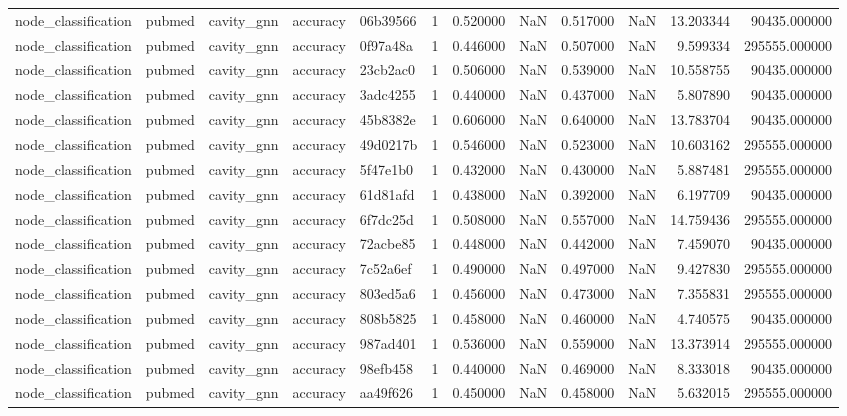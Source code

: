 \begin{tabular}{lllllrrrrrrr}
node_classification & pubmed & cavity_gnn & accuracy & 06b39566 & 1 & 0.520000 & NaN & 0.517000 & NaN & 13.203344 & 90435.000000 \\
node_classification & pubmed & cavity_gnn & accuracy & 0f97a48a & 1 & 0.446000 & NaN & 0.507000 & NaN & 9.599334 & 295555.000000 \\
node_classification & pubmed & cavity_gnn & accuracy & 23cb2ac0 & 1 & 0.506000 & NaN & 0.539000 & NaN & 10.558755 & 90435.000000 \\
node_classification & pubmed & cavity_gnn & accuracy & 3adc4255 & 1 & 0.440000 & NaN & 0.437000 & NaN & 5.807890 & 90435.000000 \\
node_classification & pubmed & cavity_gnn & accuracy & 45b8382e & 1 & 0.606000 & NaN & 0.640000 & NaN & 13.783704 & 90435.000000 \\
node_classification & pubmed & cavity_gnn & accuracy & 49d0217b & 1 & 0.546000 & NaN & 0.523000 & NaN & 10.603162 & 295555.000000 \\
node_classification & pubmed & cavity_gnn & accuracy & 5f47e1b0 & 1 & 0.432000 & NaN & 0.430000 & NaN & 5.887481 & 295555.000000 \\
node_classification & pubmed & cavity_gnn & accuracy & 61d81afd & 1 & 0.438000 & NaN & 0.392000 & NaN & 6.197709 & 90435.000000 \\
node_classification & pubmed & cavity_gnn & accuracy & 6f7dc25d & 1 & 0.508000 & NaN & 0.557000 & NaN & 14.759436 & 295555.000000 \\
node_classification & pubmed & cavity_gnn & accuracy & 72acbe85 & 1 & 0.448000 & NaN & 0.442000 & NaN & 7.459070 & 90435.000000 \\
node_classification & pubmed & cavity_gnn & accuracy & 7c52a6ef & 1 & 0.490000 & NaN & 0.497000 & NaN & 9.427830 & 295555.000000 \\
node_classification & pubmed & cavity_gnn & accuracy & 803ed5a6 & 1 & 0.456000 & NaN & 0.473000 & NaN & 7.355831 & 295555.000000 \\
node_classification & pubmed & cavity_gnn & accuracy & 808b5825 & 1 & 0.458000 & NaN & 0.460000 & NaN & 4.740575 & 90435.000000 \\
node_classification & pubmed & cavity_gnn & accuracy & 987ad401 & 1 & 0.536000 & NaN & 0.559000 & NaN & 13.373914 & 295555.000000 \\
node_classification & pubmed & cavity_gnn & accuracy & 98efb458 & 1 & 0.440000 & NaN & 0.469000 & NaN & 8.333018 & 90435.000000 \\
node_classification & pubmed & cavity_gnn & accuracy & aa49f626 & 1 & 0.450000 & NaN & 0.458000 & NaN & 5.632015 & 295555.000000 \\

\end{tabular}
